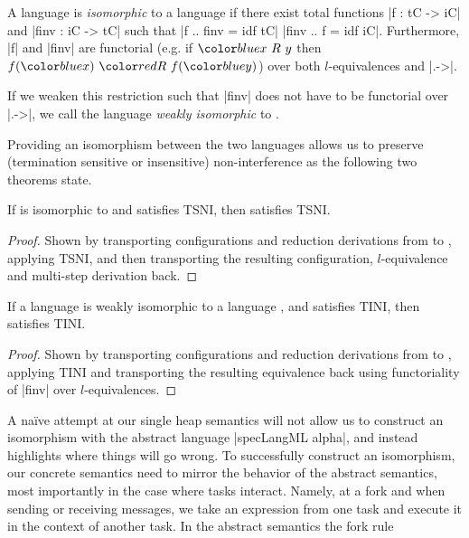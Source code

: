 \begin{definition}
  A language  is \textit{isomorphic} to a
  language  if there exist total functions |f
  : tC -> iC| and |finv : iC -> tC| such that |f .. finv = idf tC| |finv
  .. f = idf iC|.  Furthermore, |f| and |finv| are functorial (e.g. if
  $\abs{x\ R\ y}$ then $f(\abs{x})\ \con{R}\ f(\abs{y})$) over both
  $l$-equivalences and |.->|.
  
  If we weaken this restriction such that |finv| does
  not have to be functorial over |.->|, we call the
  language  \textit{weakly isomorphic} to
  .
\end{definition}

Providing an isomorphism between the two languages allows us to
preserve (termination sensitive or insensitive) non-interference
as the following two theorems state.

\begin{theorem}
  If  is isomorphic to  and  satisfies TSNI, then
   satisfies TSNI.
\end{theorem}

\begin{proof}
  Shown by transporting configurations and reduction derivations from
   to , applying TSNI, and then transporting the
  resulting configuration, $l$-equivalence and multi-step derivation back.
\end{proof}

\begin{theorem}
  If a language  is weakly isomorphic to a language , and 
  satisfies TINI, then  satisfies TINI.
\end{theorem}

\begin{proof}
  Shown by transporting configurations and reduction derivations
  from  to , applying TINI and transporting the resulting
  equivalence back using functoriality of |finv| over $l$-equivalences.
\end{proof}

A na\"ive attempt at our single heap semantics
will not allow us to construct an isomorphism
with the abstract language |specLangML alpha|, and instead highlights
where things will go wrong.
To successfully construct an isomorphism, our concrete semantics need
to mirror the behavior of the abstract semantics, most importantly
in the case where tasks interact.  Namely, at a fork and when sending
or receiving messages, we take an expression from one task and
execute it in the context of another task.  In the abstract semantics
the fork rule




